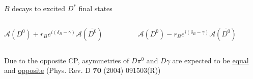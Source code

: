 \documentclass[dvipsnames]{beamer}
\begin{document}
\begin{frame}{$B$ decays to excited $D^*$ final states}
\begin{figure}[H]
\begin{subfigure}{0.45\textwidth}
    \end{subfigure}
  \end{figure}
  \vspace{-0.5cm}
  \begin{columns}
    \begin{column}{0.5\textwidth}
      \begin{center}
        $\mathcal{A}(D^0) + r_Be^{i(\delta_B - \gamma)}\mathcal{A}(\bar{D^0})$
      \end{center}
    \end{column}
    \begin{column}{0.5\textwidth}
      \begin{center}
        $\mathcal{A}(D^0) - r_Be^{i(\delta_B - \gamma)}\mathcal{A}(\bar{D^0})$
      \end{center}
    \end{column}
  \end{columns}
  \begin{center}
    \large Due to the opposite CP, asymmetries of $D\pi^0$ and $D\gamma$ are expected to be \underline{equal} and \underline{opposite} (Phys. Rev. D \textbf{70} (2004) 091503(R))
  \end{center}
\end{frame}
\end{document}
